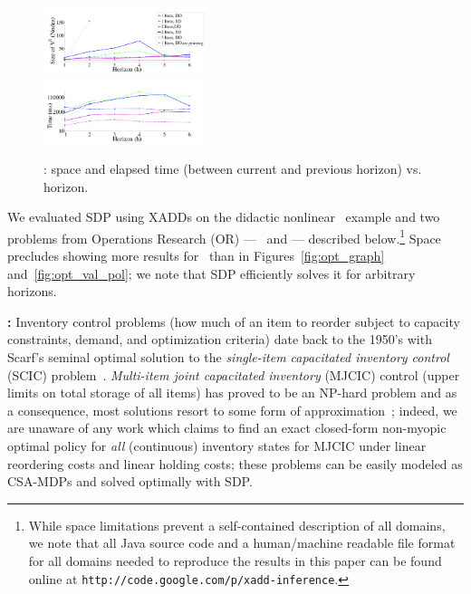 \begin{figure}[tbp!]
\vspace{-2mm}
\centering
\includegraphics[width=0.42\textwidth]{Figures/space1.pdf}\\
\vspace{-2mm}
\includegraphics[width=0.42\textwidth]{Figures/time1.pdf}
\vspace{-2mm}
\caption{\footnotesize \InventoryControl: space and elapsed time (between current and previous horizon) vs. horizon.
}
\label{fig:invC}
\vspace{-4mm}
\end{figure}

\label{sec:results}
 
We evaluated SDP using XADDs on the didactic nonlinear
\MarsRover\ example and two problems from Operations Research (OR) --- 
\InventoryControl\ and \WaterReservoir --- described below.\footnote{While 
space limitations prevent a self-contained
description of all domains, we note that all Java source code and a
human/machine readable file format for all domains needed to reproduce
the results in this paper can be found online at
\texttt{http://code.google.com/p/xadd-inference}.}
Space precludes showing 
more results for \MarsRover\ than in Figures~\ref{fig:opt_graph}
and~\ref{fig:opt_val_pol}; we note that SDP efficiently solves it
for arbitrary horizons.

{\bf \InventoryControl:} Inventory control problems (how much of an
item to reorder subject to capacity constraints, demand, and 
optimization criteria) date back to the 1950's with
Scarf's seminal optimal solution to the \emph{single-item capacitated
inventory control} (SCIC) problem~\cite{Scarf_Karlin58}.
\emph{Multi-item joint capacitated inventory} (MJCIC) control (upper limits
on total storage of all items) has proved to be an NP-hard problem and
as a consequence, most solutions resort to some form of
approximation~\cite{bitran,wusd10}; indeed, we are unaware of any 
work which claims to find an exact closed-form non-myopic
optimal policy for \emph{all} (continuous) inventory states for MJCIC 
under linear reordering costs and linear holding costs; these 
problems can be easily modeled as CSA-MDPs and solved optimally
with SDP.  


